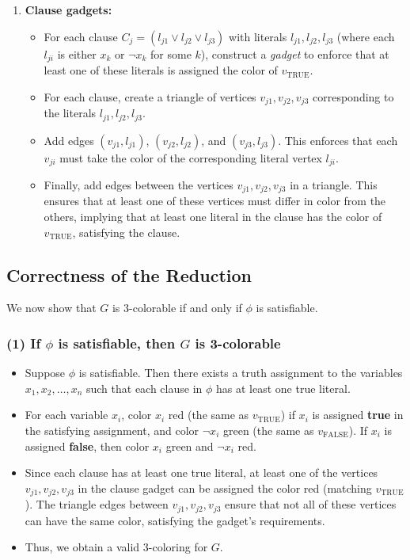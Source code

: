 \documentclass[11pt]{article}
\begin{document}
\begin{enumerate}
    \item \textbf{Clause gadgets:}
    \begin{itemize}
        \item For each clause \( C_j = (l_{j1} \vee l_{j2} \vee l_{j3}) \) with literals \( l_{j1}, l_{j2}, l_{j3} \) (where each \( l_{ji} \) is either \( x_k \) or \( \neg x_k \) for some \( k \)), construct a \textit{gadget} to enforce that at least one of these literals is assigned the color of \( v_{\text{TRUE}} \).
        \item For each clause, create a triangle of vertices \( v_{j1}, v_{j2}, v_{j3} \) corresponding to the literals \( l_{j1}, l_{j2}, l_{j3} \).
        \item Add edges \( (v_{j1}, l_{j1}) \), \( (v_{j2}, l_{j2}) \), and \( (v_{j3}, l_{j3}) \). This enforces that each \( v_{ji} \) must take the color of the corresponding literal vertex \( l_{ji} \).
        \item Finally, add edges between the vertices \( v_{j1}, v_{j2}, v_{j3} \) in a triangle. This ensures that at least one of these vertices must differ in color from the others, implying that at least one literal in the clause has the color of \( v_{\text{TRUE}} \), satisfying the clause.
    \end{itemize}
\end{enumerate}

\newpage

\subsection*{Correctness of the Reduction}

We now show that \( G \) is 3-colorable if and only if \( \phi \) is satisfiable.

\subsubsection*{(1) If \( \phi \) is satisfiable, then \( G \) is 3-colorable}

\begin{itemize}
    \item Suppose \( \phi \) is satisfiable. Then there exists a truth assignment to the variables \( x_1, x_2, \dots, x_n \) such that each clause in \( \phi \) has at least one true literal.
    \item For each variable \( x_i \), color \( x_i \) red (the same as \( v_{\text{TRUE}} \)) if \( x_i \) is assigned \textbf{true} in the satisfying assignment, and color \( \neg x_i \) green (the same as \( v_{\text{FALSE}} \)). If \( x_i \) is assigned \textbf{false}, then color \( x_i \) green and \( \neg x_i \) red.
    \item Since each clause has at least one true literal, at least one of the vertices \( v_{j1}, v_{j2}, v_{j3} \) in the clause gadget can be assigned the color red (matching \( v_{\text{TRUE}} \)). The triangle edges between \( v_{j1}, v_{j2}, v_{j3} \) ensure that not all of these vertices can have the same color, satisfying the gadget’s requirements.
    \item Thus, we obtain a valid 3-coloring for \( G \).
\end{itemize}
\end{document}
